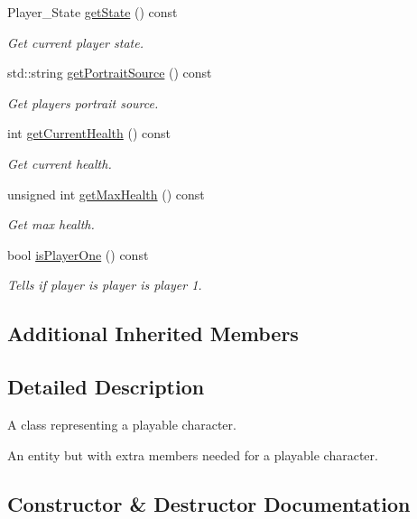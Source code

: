 \begin{DoxyCompactItemize}
Player\+\_\+\+State \hyperlink{classPlayer_a37a57d7d3ee9e4a1a6376ac54bb71642}{get\+State} () const
\begin{DoxyCompactList}\small\item\em Get current player state. \end{DoxyCompactList}\item 
std\+::string \hyperlink{classPlayer_a6e54a09592987eef8d690ef06d815d6b}{get\+Portrait\+Source} () const
\begin{DoxyCompactList}\small\item\em Get player\textquotesingle{}s portrait source. \end{DoxyCompactList}\item 
int \hyperlink{classPlayer_ad527d6ed6e22851b0e58455ad1d602da}{get\+Current\+Health} () const
\begin{DoxyCompactList}\small\item\em Get current health. \end{DoxyCompactList}\item 
unsigned int \hyperlink{classPlayer_a367fed9b576ce0058c6f419f91ec3c7d}{get\+Max\+Health} () const
\begin{DoxyCompactList}\small\item\em Get max health. \end{DoxyCompactList}\item 
bool \hyperlink{classPlayer_ae70f285a61f1bb20d824f44cb28efa4b}{is\+Player\+One} () const
\begin{DoxyCompactList}\small\item\em Tells if player is player is player 1. \end{DoxyCompactList}\end{DoxyCompactItemize}
\subsection*{Additional Inherited Members}


\subsection{Detailed Description}
A class representing a playable character. 

An entity but with extra members needed for a playable character. 

\subsection{Constructor \& Destructor Documentation}
\mbox{\label{classPlayer_aaa23b3bf80e8c0267cf08d4fe4d6ddc1}} 
